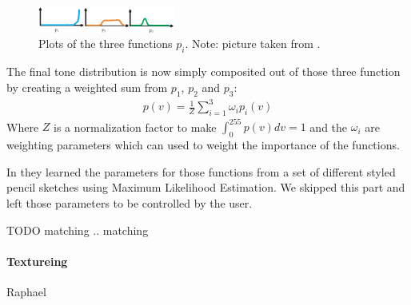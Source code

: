 \begin{figure}[htb]
  \centering
  \includegraphics[width=0.4\textwidth]{images/p_i.png}
  \caption{Plots of the three functions $p_i$. Note: picture taken from
    \cite{mainPaper}.}
  \label{fig:p}
\end{figure}

The final tone distribution is now simply composited out of those three
function by creating a weighted sum from $p_1$, $p_2$ and $p_3$:
\begin{align}
  p(v) = \frac{1}{Z} \sum_{i=1}^{3}\omega_i p_i(v)
  \label{eq:p}
\end{align}
Where $Z$ is a normalization factor to make $\int_0^{255}p(v)dv = 1$ and the
$\omega_i$ are weighting parameters which can used to weight the importance of
the functions.

In \cite{mainPaper} they learned the parameters for those functions from a set
of different styled pencil sketches using Maximum Likelihood Estimation. We skipped this part and left those
parameters to be controlled by the user.

TODO matching .. matching
\paragraph{Textureing}
Raphael
